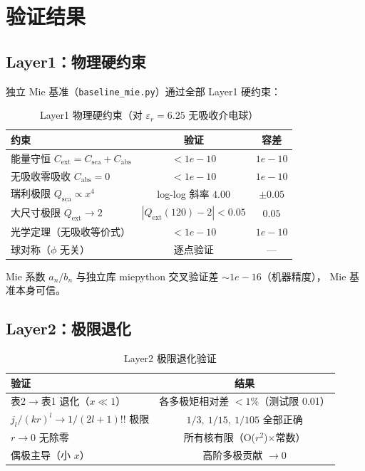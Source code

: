 \section{验证结果}

\subsection{Layer1：物理硬约束}

独立 Mie 基准（\texttt{baseline\_mie.py}）通过全部 Layer1 硬约束：

\begin{table}[H]
\centering
\caption{Layer1 物理硬约束（对 $\varepsilon_r=6.25$ 无吸收介电球）}
\begin{tabular}{lcc}
\toprule
\textbf{约束} & \textbf{验证} & \textbf{容差} \\
\midrule
能量守恒 $C_{\mathrm{ext}}=C_{\mathrm{sca}}+C_{\mathrm{abs}}$ & $<1e{-}10$ & $1e{-}10$ \\
无吸收零吸收 $C_{\mathrm{abs}}=0$ & $<1e{-}10$ & $1e{-}10$ \\
瑞利极限 $Q_{\mathrm{sca}}\propto x^4$ & log-log 斜率 $4.00$ & $\pm0.05$ \\
大尺寸极限 $Q_{\mathrm{ext}}\to2$ & $|Q_{\mathrm{ext}}(120)-2|<0.05$ & $0.05$ \\
光学定理（无吸收等价式） & $<1e{-}10$ & $1e{-}10$ \\
球对称（$\phi$ 无关） & 逐点验证 & --- \\
\bottomrule
\end{tabular}
\end{table}

Mie 系数 $a_n/b_n$ 与独立库 miepython 交叉验证差 $\sim1e{-}16$（机器精度），
Mie 基准本身可信。

\subsection{Layer2：极限退化}

\begin{table}[H]
\centering
\caption{Layer2 极限退化验证}
\begin{tabular}{lc}
\toprule
\textbf{验证} & \textbf{结果} \\
\midrule
表2$\to$表1 退化（$x\ll1$） & 各多极矩相对差 $<1\%$（测试限 0.01） \\
$j_l/(kr)^l\to1/(2l+1)!!$ 极限 & $1/3,\ 1/15,\ 1/105$ 全部正确 \\
$r\to0$ 无除零 & 所有核有限（O($r^2$)$\times$常数） \\
偶极主导（小 $x$） & 高阶多极贡献 $\to0$ \\
\bottomrule
\end{tabular}
\end{table}

